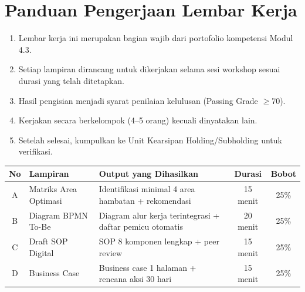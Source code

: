 \documentclass[12pt,a4paper]{report}
\begin{document}
\newcommand{\fillline}[1][6cm]{\underline{\hspace{#1}}}
\newcommand{\writespace}[1][2cm]{\rule{0pt}{#1}}

\thispagestyle{fancy}

\section*{\color{plnblue}Panduan Pengerjaan Lembar Kerja}

\begin{wsinfobox}
\begin{enumerate}
    \item Lembar kerja ini merupakan bagian wajib dari portofolio kompetensi Modul 4.3.
    \item Setiap lampiran dirancang untuk dikerjakan selama sesi workshop sesuai durasi yang telah ditetapkan.
    \item Hasil pengisian menjadi syarat penilaian kelulusan (Passing Grade $\geq$70).
    \item Kerjakan secara berkelompok (4--5 orang) kecuali dinyatakan lain.
    \item Setelah selesai, kumpulkan ke Unit Kearsipan Holding/Subholding untuk verifikasi.
\end{enumerate}
\end{wsinfobox}

\vspace{0.4cm}


\vspace{0.2cm}

{\small
\renewcommand{\arraystretch}{1.6}
\begin{tabularx}{\textwidth}{@{} c p{4.2cm} X c c @{}}
\toprule
\textbf{No} & \textbf{Lampiran} & \textbf{Output yang Dihasilkan} & \textbf{Durasi} & \textbf{Bobot} \\
\midrule
A & Matriks Area Optimasi & Identifikasi minimal 4 area hambatan + rekomendasi & 15 menit & 25\% \\
B & Diagram BPMN To-Be & Diagram alur kerja terintegrasi + daftar pemicu otomatis & 20 menit & 25\% \\
C & Draft SOP Digital & SOP 8 komponen lengkap + peer review & 15 menit & 25\% \\
D & Business Case & Business case 1 halaman + rencana aksi 30 hari & 15 menit & 25\% \\
\bottomrule
\end{tabularx}
\renewcommand{\arraystretch}{1.0}
}
\end{document}
